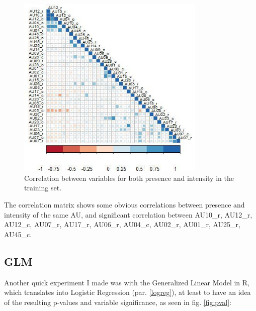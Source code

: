 \begin{figure}[H]
	\centering
	\includegraphics[width=0.8\textwidth]{images/correlation_matrix}
	\caption{Correlation between variables for both presence and intensity in the training set.}
	\label{fig:correlation_matrix}
\end{figure}

The correlation matrix shows some obvious correlations between presence and intensity of the same AU, and significant correlation between AU10\_r, AU12\_r, AU12\_c, AU07\_r, AU17\_r, AU06\_r, AU04\_c, AU02\_r, AU01\_r, AU25\_r, AU45\_c.

\clearpage

\subsection{GLM} \label{GLM}
Another quick experiment I made was with the Generalized Linear Model in R, which translates into Logistic Regression (par. \ref{logreg}), at least to have an idea of the resulting p-values and variable significance, as seen in fig. \ref{fig:pval}:

